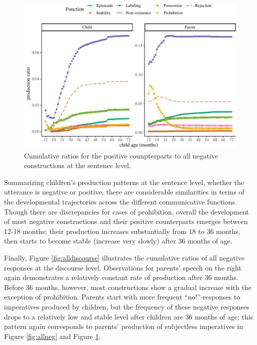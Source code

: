 \documentclass[
  man,floatsintext]{apa6}
\begin{document}
\begin{figure}[H]

{\centering \includegraphics{neg_construction_article_files/figure-latex/allpos-1} 

}

\caption{Cumulative ratios for the positive counpterparts to all negative constructions at the sentence level.}\label{fig:allpos}
\end{figure}

Summarizing children's production patterns at the sentence level, whether the utterance is negative or positive, there are considerable similarities in terms of the developmental trajectories across the different communicative functions. Though there are discrepancies for cases of prohibition, overall the development of most negative constructions and their positive counterparts emerges between 12-18 months; their production increases substantially from 18 to 36 months, then starts to become stable (increase very slowly) after 36 months of age.

Finally, Figure \ref{fig:alldiscourse} illustrates the cumulative ratios of all negative responses at the discourse level. Observations for parents' speech on the right again demonstrates a relatively constant rate of production after 36 months. Before 36 months, however, most constructions show a gradual increase with the exception of prohibition. Parents start with more frequent ``no!''-responses to imperatives produced by children, but the frequency of these negative responses drops to a relatively low and stable level after children are 36 months of age; this pattern again corresponds to parents' production of subjectless imperatives in Figure \ref{fig:allneg} and Figure \ref{fig:allpos}.
\end{document}
